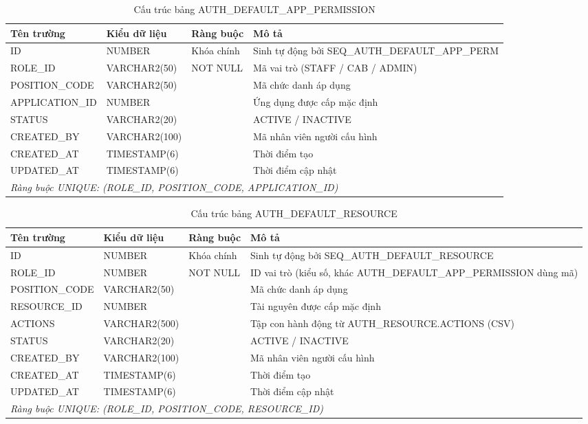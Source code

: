 \documentclass[../DoAn.tex]{subfiles}
\begin{document}
\begin{table}[H]
\centering
\caption{Cấu trúc bảng AUTH\_DEFAULT\_APP\_PERMISSION}
\label{tab:auth-default-app-perm}
\footnotesize
\begin{tabular}{|p{3.0cm}|p{2.3cm}|p{2.7cm}|p{4.5cm}|}
\hline
\textbf{Tên trường} & \textbf{Kiểu dữ liệu} & \textbf{Ràng buộc} & \textbf{Mô tả} \\ \hline
ID & NUMBER & Khóa chính & Sinh tự động bởi SEQ\_AUTH\_DEFAULT\_APP\_PERM \\ \hline
ROLE\_ID & VARCHAR2(50) & NOT NULL & Mã vai trò (STAFF / CAB / ADMIN) \\ \hline
POSITION\_CODE & VARCHAR2(50) & & Mã chức danh áp dụng \\ \hline
APPLICATION\_ID & NUMBER & & Ứng dụng được cấp mặc định \\ \hline
STATUS & VARCHAR2(20) & & ACTIVE / INACTIVE \\ \hline
CREATED\_BY & VARCHAR2(100) & & Mã nhân viên người cấu hình \\ \hline
CREATED\_AT & TIMESTAMP(6) & & Thời điểm tạo \\ \hline
UPDATED\_AT & TIMESTAMP(6) & & Thời điểm cập nhật \\ \hline
\multicolumn{4}{|l|}{\textit{Ràng buộc UNIQUE: (ROLE\_ID, POSITION\_CODE, APPLICATION\_ID)}} \\ \hline
\end{tabular}
\end{table}

\begin{table}[H]
\centering
\caption{Cấu trúc bảng AUTH\_DEFAULT\_RESOURCE}
\label{tab:auth-default-resource}
\footnotesize
\begin{tabular}{|p{3.0cm}|p{2.3cm}|p{2.7cm}|p{4.5cm}|}
\hline
\textbf{Tên trường} & \textbf{Kiểu dữ liệu} & \textbf{Ràng buộc} & \textbf{Mô tả} \\ \hline
ID & NUMBER & Khóa chính & Sinh tự động bởi SEQ\_AUTH\_DEFAULT\_RESOURCE \\ \hline
ROLE\_ID & NUMBER & NOT NULL & ID vai trò (kiểu số, khác AUTH\_DEFAULT\_APP\_PERMISSION dùng mã) \\ \hline
POSITION\_CODE & VARCHAR2(50) &  & Mã chức danh áp dụng \\ \hline
RESOURCE\_ID & NUMBER & & Tài nguyên được cấp mặc định \\ \hline
ACTIONS & VARCHAR2(500) & & Tập con hành động từ AUTH\_RESOURCE.ACTIONS (CSV) \\ \hline
STATUS & VARCHAR2(20) & & ACTIVE / INACTIVE \\ \hline
CREATED\_BY & VARCHAR2(100) & & Mã nhân viên người cấu hình \\ \hline
CREATED\_AT & TIMESTAMP(6) & & Thời điểm tạo \\ \hline
UPDATED\_AT & TIMESTAMP(6) & & Thời điểm cập nhật \\ \hline
\multicolumn{4}{|l|}{\textit{Ràng buộc UNIQUE: (ROLE\_ID, POSITION\_CODE, RESOURCE\_ID)}} \\ \hline
\end{tabular}
\end{table}
\end{document}
